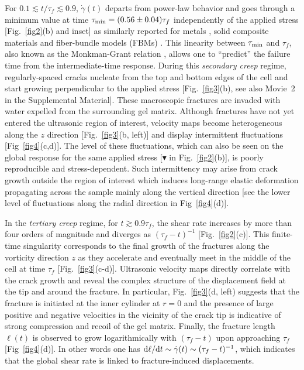 \documentclass[twocolumn,superscriptaddress,showpacs,preprintnumbers,amsmath,amssymb,prl]{revtex4}
\newcommand\gp{\dot\gamma}
\begin{document}
For $0.1\lesssim t/\tau_f\lesssim 0.9$, $\gp(t)$ departs from power-law behavior and goes through a minimum value at time $\tau_{\rm min}= (0.56\pm0.04)\tau_f$ independently of the applied stress [Fig.~\ref{fig2}(b) and inset] as similarly reported for metals \cite{Sundararajan:1989}, solid composite materials \cite{Nechad:2005} and fiber-bundle models (FBMs) \cite{Kovacs:2008,Jagla:2011}. This linearity between $\tau_{\rm min}$ and $\tau_f$, also known as the Monkman-Grant relation \cite{Monkman:1956}, allows one to ``predict'' the failure time from the intermediate-time response. During this {\it secondary creep} regime, regularly-spaced cracks nucleate from the top and bottom edges of the cell and start growing perpendicular to the applied stress [Fig.~\ref{fig3}(b), see also Movie~2 in the Supplemental Material]. These macroscopic fractures are invaded with water expelled from the surrounding gel matrix. Although fractures have not yet entered the ultrasonic region of interest, velocity maps become heterogeneous along the $z$ direction [Fig.~\ref{fig3}(b, left)] and display intermittent fluctuations [Fig~\ref{fig4}(c,d)]. The level of these fluctuations, which can also be seen on the global response for the same applied stress [\textcolor{red!50!black}{$\blacktriangledown$} in Fig.~\ref{fig2}(b)], is poorly reproducible and stress-dependent. Such intermittency may arise from crack growth outside the region of interest which induces long-range elastic deformation propagating across the sample mainly along the vertical direction [see the lower level of fluctuations along the radial direction in Fig~\ref{fig4}(d)].

In the {\it tertiary creep} regime, for $t\gtrsim 0.9\tau_f$, the shear rate increases by more than four orders of magnitude and diverges as $(\tau_f-t)^{-1}$ [Fig.~\ref{fig2}(c)]. This finite-time singularity corresponds to the final growth of the fractures along the vorticity direction $z$ as they accelerate and eventually meet in the middle of the cell at time $\tau_f$ [Fig.~\ref{fig3}(c-d)]. Ultrasonic velocity maps directly correlate with the crack growth and reveal the complex structure of the displacement field at the tip and around the fracture. In particular, Fig.~\ref{fig3}(d, left) suggests that the fracture is initiated at the inner cylinder at $r=0$ and the presence of large positive and negative velocities in the vicinity of the crack tip is indicative of strong compression and recoil of the gel matrix. Finally, the fracture length $\ell(t)$ is observed to grow logarithmically with $(\tau_f-t)$ upon approaching $\tau_f$ [Fig~\ref{fig4}(d)]. In other words one has ${\rm d}\ell/{\rm d}t\sim\gp(t)\sim (\tau_f-t)^{-1}$, which indicates that the global shear rate is linked to fracture-induced displacements.
\end{document}
